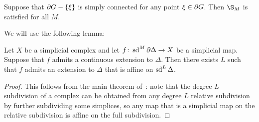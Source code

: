 \documentclass[a4paper]{article}
\begin{document}
\begin{proposition}\label{prop:sufficient_condition}
  Suppose that $\partial G - \left\{\xi\right\}$ is simply connected for any point $\xi
  \in \partial G$. Then $\S_M$ is satisfied for all $M$.
\end{proposition}

We will use the following lemma:

\begin{lemma}\label{lem:relative_approximation}
  Let $X$ be a simplicial complex and let $f\colon\operatorname{sd}^M\partial\Delta\to X$ be
  a simplicial map. Suppose that $f$ admits a continuous extension to $\Delta$.
  Then there exists $L$ such that $f$ admits an extension to $\Delta$ that is
  affine on $\operatorname{sd}^L\Delta$. 
\end{lemma}

\begin{proof}
  This follows from the main theorem of~\cite{zeeman64}: note that the degree
  $L$ subdivision of a complex can be obtained from any degree $L$ relative
  subdivision by further subdividing some simplices, so any map that is a
  simplicial map on the relative subdivision is affine on the full subdivision.
\end{proof}
\end{document}
